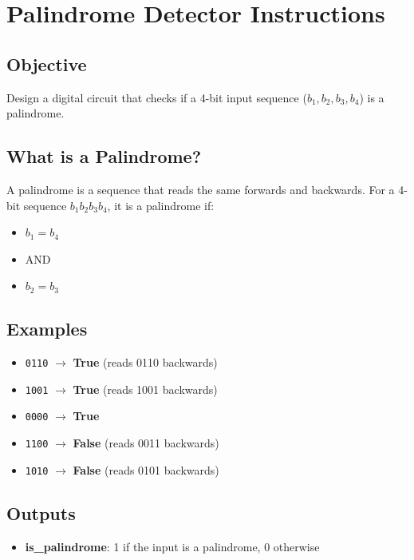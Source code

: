 \section*{Palindrome Detector Instructions}

\subsection*{Objective}
Design a digital circuit that checks if a 4-bit input sequence ($b_1, b_2, b_3, b_4$) is a palindrome.

\subsection*{What is a Palindrome?}
A palindrome is a sequence that reads the same forwards and backwards.
For a 4-bit sequence $b_1 b_2 b_3 b_4$, it is a palindrome if:
\begin{itemize}
  \item $b_1 = b_4$
  \item AND
  \item $b_2 = b_3$
\end{itemize}

\subsection*{Examples}
\begin{itemize}
  \item \texttt{0110} $\to$ \textbf{True} (reads 0110 backwards)
  \item \texttt{1001} $\to$ \textbf{True} (reads 1001 backwards)
  \item \texttt{0000} $\to$ \textbf{True}
  \item \texttt{1100} $\to$ \textbf{False} (reads 0011 backwards)
  \item \texttt{1010} $\to$ \textbf{False} (reads 0101 backwards)
\end{itemize}

\subsection*{Outputs}
\begin{itemize}
  \item \textbf{is\_palindrome}: 1 if the input is a palindrome, 0 otherwise
\end{itemize}

